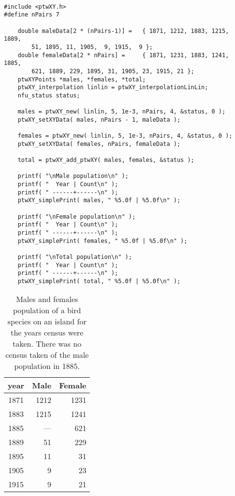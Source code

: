\documentclass[11pt]{article}
\begin{document}
\begin{verbatim}

#include <ptwXY.h>
#define nPairs 7

    double maleData[2 * (nPairs-1)] =   { 1871, 1212, 1883, 1215, 1889,  
        51, 1895, 11, 1905,  9, 1915,  9 };
    double femaleData[2 * nPairs] =     { 1871, 1231, 1883, 1241, 1885, 
        621, 1889, 229, 1895, 31, 1905, 23, 1915, 21 };
    ptwXYPoints *males, *females, *total;
    ptwXY_interpolation linlin = ptwXY_interpolationLinLin;
    nfu_status status;

    males = ptwXY_new( linlin, 5, 1e-3, nPairs, 4, &status, 0 );
    ptwXY_setXYData( males, nPairs - 1, maleData );

    females = ptwXY_new( linlin, 5, 1e-3, nPairs, 4, &status, 0 );
    ptwXY_setXYData( females, nPairs, femaleData );

    total = ptwXY_add_ptwXY( males, females, &status );

    printf( "\nMale population\n" );
    printf( "  Year | Count\n" );
    printf( " ------+------\n" );
    ptwXY_simplePrint( males, " %5.0f | %5.0f\n" );

    printf( "\nFemale population\n" );
    printf( "  Year | Count\n" );
    printf( " ------+------\n" );
    ptwXY_simplePrint( females, " %5.0f | %5.0f\n" );

    printf( "\nTotal population\n" );
    printf( "  Year | Count\n" );
    printf( " ------+------\n" );
    ptwXY_simplePrint( total, " %5.0f | %5.0f\n" );
\end{verbatim}

\begin{table}
\begin{center}
\begin{tabular}{|c|r|r|}  \hline
    year    & Male  & Female \\ \hline \hline
    1871    & 1212  & 1231  \\ \hline
    1883    & 1215  & 1241  \\ \hline
    1885    &  ---  & 621   \\ \hline
    1889    & 51    & 229   \\ \hline
    1895    & 11    & 31    \\ \hline
    1905    & 9     & 23    \\ \hline
    1915    & 9     & 21    \\ \hline
\end{tabular}
\end{center}
\caption{Males and females population of a bird species on an island for the years census were taken. There was
no census taken of the male population in 1885.\label{B1Pop}}
\end{table}
\end{document}
